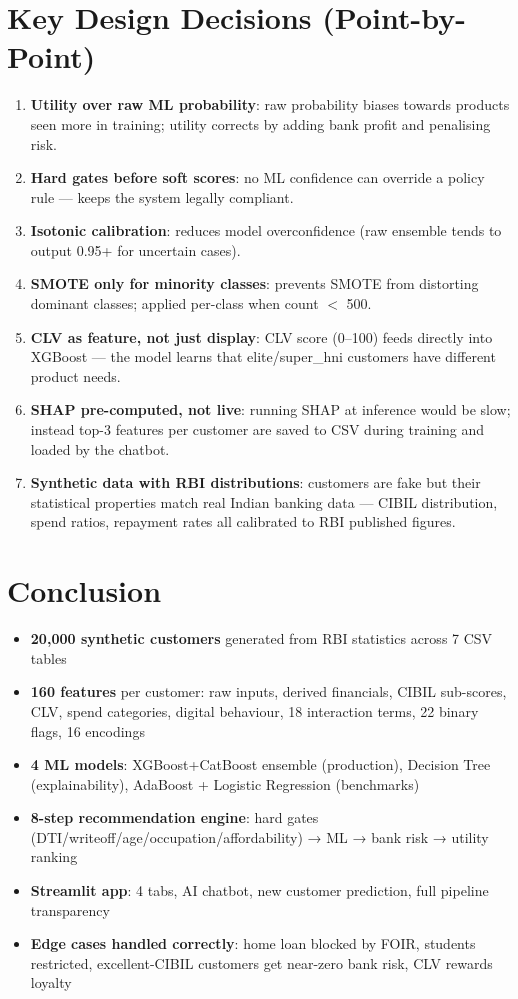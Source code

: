 \documentclass[12pt,a4paper]{article}
\begin{document}
\section{Key Design Decisions (Point-by-Point)}

\begin{enumerate}[leftmargin=*,itemsep=3pt]
  \item \textbf{Utility over raw ML probability}: raw probability biases towards products seen more in training; utility corrects by adding bank profit and penalising risk.
  \item \textbf{Hard gates before soft scores}: no ML confidence can override a policy rule — keeps the system legally compliant.
  \item \textbf{Isotonic calibration}: reduces model overconfidence (raw ensemble tends to output 0.95+ for uncertain cases).
  \item \textbf{SMOTE only for minority classes}: prevents SMOTE from distorting dominant classes; applied per-class when count $<$ 500.
  \item \textbf{CLV as feature, not just display}: CLV score (0--100) feeds directly into XGBoost — the model learns that elite/super\_hni customers have different product needs.
  \item \textbf{SHAP pre-computed, not live}: running SHAP at inference would be slow; instead top-3 features per customer are saved to CSV during training and loaded by the chatbot.
  \item \textbf{Synthetic data with RBI distributions}: customers are fake but their statistical properties match real Indian banking data — CIBIL distribution, spend ratios, repayment rates all calibrated to RBI published figures.
\end{enumerate}

\section{Conclusion}

\begin{itemize}[leftmargin=*,itemsep=2pt]
  \item \textbf{20{,}000 synthetic customers} generated from RBI statistics across 7 CSV tables
  \item \textbf{160 features} per customer: raw inputs, derived financials, CIBIL sub-scores, CLV, spend categories, digital behaviour, 18 interaction terms, 22 binary flags, 16 encodings
  \item \textbf{4 ML models}: XGBoost+CatBoost ensemble (production), Decision Tree (explainability), AdaBoost + Logistic Regression (benchmarks)
  \item \textbf{8-step recommendation engine}: hard gates (DTI/writeoff/age/occupation/affordability) → ML → bank risk → utility ranking
  \item \textbf{Streamlit app}: 4 tabs, AI chatbot, new customer prediction, full pipeline transparency
  \item \textbf{Edge cases handled correctly}: home loan blocked by FOIR, students restricted, excellent-CIBIL customers get near-zero bank risk, CLV rewards loyalty
\end{itemize}
\end{document}

